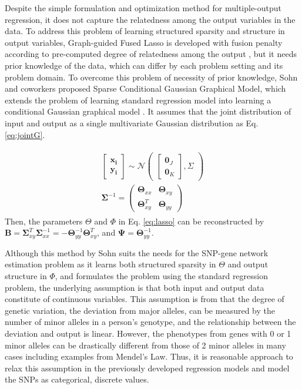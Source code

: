 \documentclass{article}
\begin{document}
Despite the simple formulation and optimization method for multiple-output regression, it does not capture the relatedness among the output variables in the data. To address this problem of learning structured sparsity and structure in output variables, Graph-guided Fused Lasso is developed with fusion penalty according to pre-computed degree of relatedness among the output \cite{kim2009statistical}, but it needs prior knowledge of the data, which can differ by each problem setting and its problem domain. To overcome this problem of necessity of prior knowledge, Sohn and coworkers proposed Sparse Conditional Gaussian Graphical Model, which extends the problem of learning standard regression model into learning a conditional Gaussian graphical model \cite{sohn2012joint}. It assumes that the joint distribution of input and output as a single multivariate Gaussian distribution as Eq. \ref{eq:jointG}.

\begin{align}\label{eq:jointG}
\begin{split}
\begin{bmatrix}
    \mathbf{x_i}\\
    \mathbf{y_i}
\end{bmatrix}
 \sim \mathcal{N}
 \begin{pmatrix}
\begin{bmatrix}
    \mathbf{0}_J  \\
   \mathbf{0}_K
\end{bmatrix}
,
    \Sigma
\end{pmatrix} \\
\mathbf{\Sigma}^{-1}= \begin{pmatrix}
    \mathbf{\Theta}_{xx} & \mathbf{\Theta}_{xy}\\
   \mathbf{\Theta}_{xy}^T &  \mathbf{\Theta}_{yy}  
\end{pmatrix}
\end{split}
\end{align}
Then, the parameters $\Theta$ and $\Phi$ in Eq. \ref{eq:lasso} can be reconstructed by $\mathbf{B}=\mathbf{\Sigma}_{xy}^T \mathbf{\Sigma}_{xx}^{-1}=-\mathbf{\Theta}_{yy}^{-1}\mathbf{\Theta}_{xy}^T$, and $\mathbf{\Psi}= \mathbf{\Theta}_{yy}^{-1}$.

Although this method by Sohn suits the needs for the SNP-gene network estimation problem as it learns both structured sparsity in $\Theta$ and output structure in $\Phi$, and formulates the problem using the standard regression problem, the underlying assumption is that both input and output data constitute of continuous variables. This assumption is from that the degree of genetic variation, the deviation from major alleles, can be measured by the number of minor alleles in a person's genotype, and the relationship between the deviation and output is linear. However, the phenotypes from genes with 0 or 1 minor alleles can be drastically different from those of 2 minor alleles in many cases including examples from Mendel's Law.  Thus, it is reasonable approach to relax this assumption in the previously developed regression models and model the SNPs as categorical, discrete values.
\end{document}
